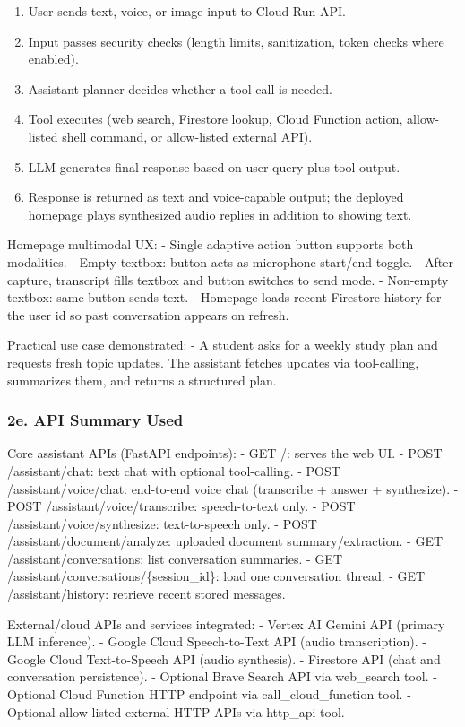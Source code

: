 \documentclass[
]{article}
\providecommand{\tightlist}{%
  \setlength{\itemsep}{0pt}\setlength{\parskip}{0pt}}
\begin{document}
\begin{enumerate}
\def\labelenumi{\arabic{enumi}.}
\tightlist
\item
  User sends text, voice, or image input to Cloud Run API.
\item
  Input passes security checks (length limits, sanitization, token
  checks where enabled).
\item
  Assistant planner decides whether a tool call is needed.
\item
  Tool executes (web search, Firestore lookup, Cloud Function action,
  allow-listed shell command, or allow-listed external API).
\item
  LLM generates final response based on user query plus tool output.
\item
  Response is returned as text and voice-capable output; the deployed
  homepage plays synthesized audio replies in addition to showing text.
\end{enumerate}

Homepage multimodal UX: - Single adaptive action button supports both
modalities. - Empty textbox: button acts as microphone start/end toggle.
- After capture, transcript fills textbox and button switches to send
mode. - Non-empty textbox: same button sends text. - Homepage loads
recent Firestore history for the user id so past conversation appears on
refresh.

Practical use case demonstrated: - A student asks for a weekly study
plan and requests fresh topic updates. The assistant fetches updates via
tool-calling, summarizes them, and returns a structured plan.

\subsubsection{2e. API Summary Used}\label{e.-api-summary-used}

Core assistant APIs (FastAPI endpoints): - GET /: serves the web UI. -
POST /assistant/chat: text chat with optional tool-calling. - POST
/assistant/voice/chat: end-to-end voice chat (transcribe + answer +
synthesize). - POST /assistant/voice/transcribe: speech-to-text only. -
POST /assistant/voice/synthesize: text-to-speech only. - POST
/assistant/document/analyze: uploaded document summary/extraction. - GET
/assistant/conversations: list conversation summaries. - GET
/assistant/conversations/\{session\_id\}: load one conversation thread.
- GET /assistant/history: retrieve recent stored messages.

External/cloud APIs and services integrated: - Vertex AI Gemini API
(primary LLM inference). - Google Cloud Speech-to-Text API (audio
transcription). - Google Cloud Text-to-Speech API (audio synthesis). -
Firestore API (chat and conversation persistence). - Optional Brave
Search API via web\_search tool. - Optional Cloud Function HTTP endpoint
via call\_cloud\_function tool. - Optional allow-listed external HTTP
APIs via http\_api tool.
\end{document}
